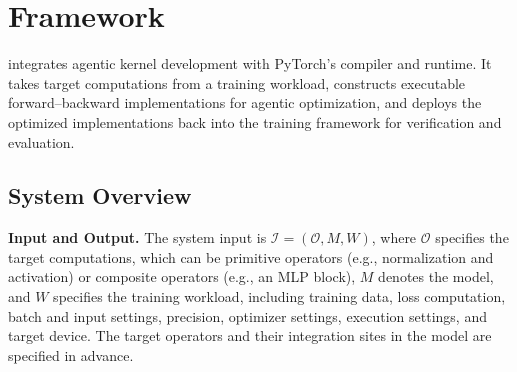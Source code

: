 \section{\name Framework}\label{sec:framework}


\system integrates agentic kernel development with PyTorch's compiler and runtime. It takes target computations from a training workload, constructs executable forward--backward implementations for agentic optimization, and deploys the optimized implementations back into the training framework for verification and evaluation.

\subsection{System Overview}
\label{sec:design_overview}

\noindent\textbf{Input and Output.}
The system input is $\mathcal I=(\mathcal O,M,W)$, where $\mathcal O$ specifies the target computations, which can be primitive operators (e.g., normalization and activation) or composite operators (e.g., an MLP block), $M$ denotes the model, and $W$ specifies the training workload, including training data, loss computation, batch and input settings, precision, optimizer settings, execution settings, and target device. The target operators and their integration sites in the model are specified in advance.


